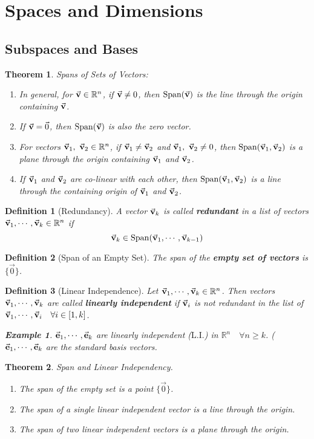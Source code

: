\documentclass[12pt, a4paper]{article}
\newtheorem{thm}{Theorem}[subsection]
\newtheorem{df}{Definition}[subsection]
\newtheorem{eg}{Example}[subsection]
\def\R{{\mathbb{R}}}
\def\Span{\mathrm{Span}}
\def\vecv{\va{v}}
\def\vece{\va{e}}
\def\LI{\mathrm{L.I.}}
\begin{document}
\newpage
\section{Spaces and Dimensions}
\subsection{Subspaces and Bases}
\begin{thm}
Spans of Sets of Vectors: 
	\begin{enumerate}
		\item In general, for $\vecv\in\R^n$, if $\vecv\neq0$, then $\Span(\vecv)$ is the line through the origin containing $\vecv$.
		\item If $\vecv=\vec{0}$, then $\Span(\vecv)$ is also the zero vector.
		\item For vectors $\vecv_1,\ \vecv_2\in\R^n$, if $\vecv_1\neq\vecv_2$ and $\vecv_1,\ \vecv_2\neq0$, then $\Span(\vecv_1,\vecv_2)$ is a plane through the origin containing $\vecv_1$ and $\vecv_2$. 
		\item If $\vecv_1$ and $\vecv_2$ are co-linear with each other, then $\Span(\vecv_1,\vecv_2)$ is a line through the containing origin of $\vecv_1$ and $\vecv_2$.
	\end{enumerate}
\end{thm}
\begin{df}[Redundancy]
	A vector $\vecv_k$ is called \textbf{redundant} in a list of vectors $\vecv_1,\cdots,\vecv_k\in\R^n$ if \[\vecv_k\in\Span(\vecv_1,\cdots,\vecv_{k-1})\]	
\end{df}
\begin{df}[Span of an Empty Set]
	The span of the \textbf{empty set of vectors} is $\{\vec{0}\}$. 	
\end{df}
\begin{df}[Linear Independence]
	Let $\vecv_1,\cdots,\vecv_k\in\R^n$. Then vectors $\vecv_1,\cdots,\vecv_k$ are called \textbf{linearly independent} if $\vecv_i$ is not redundant in the list of $\vecv_1,\cdots,\vecv_i\quad\forall i\in[1,k]$. 
	\begin{eg}
		$\vece_1,\cdots,\vece_k$ are linearly independent ($\LI$) in $\R^n\quad\forall n\geq k$. ($\vece_1,\cdots,\vece_k$ are the standard basis vectors.	
	\end{eg}
\end{df}
\begin{thm}
	Span and Linear Independency.
	\begin{enumerate}
		\item The span of the empty set is a point $\{\vec{0}\}$.
		\item The span of a single linear independent vector is a line through the origin.
		\item The span of two linear independent vectors is a plane through the origin. 
	\end{enumerate}	
\end{thm}
\end{document}
